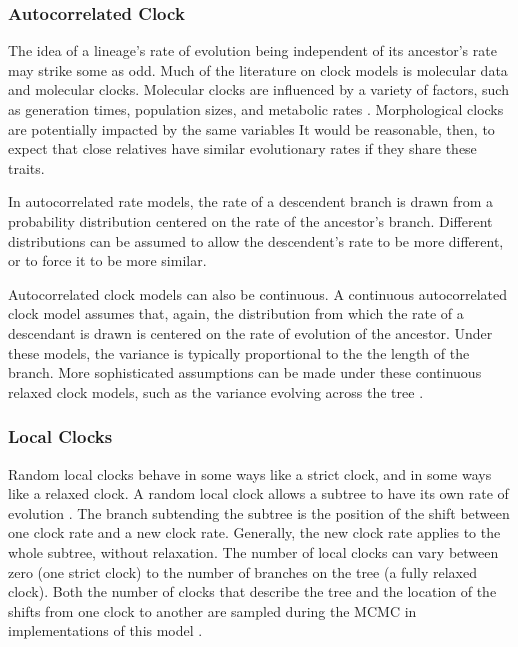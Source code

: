 \subsubsection{Autocorrelated Clock}
The idea of %
a lineage's rate of evolution being independent of its ancestor's rate may strike some as odd.
Much of the literature on clock models is  molecular data and molecular clocks.
Molecular clocks are influenced by a variety of factors, such as generation times, population sizes, and metabolic rates \citep{bromham1996, gaut1992}.
Morphological clocks are potentially impacted by the same variables %
It would be reasonable, then, to expect that close relatives have similar evolutionary rates if they share these traits.

In autocorrelated rate models, the rate of a descendent branch is drawn from a probability distribution \citep{Aris-Brosou2002} centered on the rate of the ancestor's branch.
Different distributions can be assumed to allow the descendent's rate to be more different, or to force it to be more similar.


Autocorrelated clock models can also be continuous.
A continuous autocorrelated clock model assumes that, again, the distribution from which the rate of a descendant is drawn is centered on the rate of evolution of the ancestor.
Under these models,  the variance is typically proportional to the the length of the branch.
More sophisticated assumptions can be made under these continuous  relaxed clock models, such as the variance  evolving across the tree \citep{Thorne1998, Kishino2001, Thorne2002, Aris-Brosou2002, Aris-Brosou2003}.

\subsubsection{Local Clocks}

Random local clocks behave in some ways like a strict clock, and in some ways like a relaxed clock.
A random local clock allows a subtree to have its own rate of evolution \citep{yoder2000}.
The branch subtending the subtree is the position of the shift between one clock rate and a new clock rate.
Generally, the new clock rate applies to the whole subtree, without relaxation.
The number of local clocks can vary between zero (one strict clock) to the number of branches on the tree (a fully relaxed clock).
Both the number of clocks that describe the tree and the location of the shifts from one clock to another are sampled during the MCMC in implementations of this model \citep{Drummond2010}.


